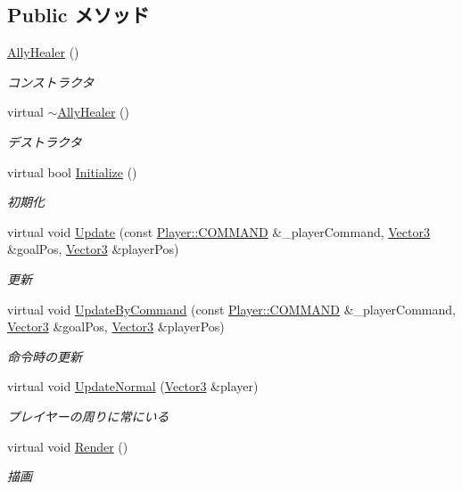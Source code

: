 \subsection*{Public メソッド}
\begin{DoxyCompactItemize}
\item 
\hyperlink{class_ally_healer_a7d6842f1f2ffd2c76b7377963f5a609c}{Ally\-Healer} ()
\begin{DoxyCompactList}\small\item\em コンストラクタ \end{DoxyCompactList}\item 
virtual \hyperlink{class_ally_healer_a7bbf70f818b82171e2224d83729d20a3}{$\sim$\-Ally\-Healer} ()
\begin{DoxyCompactList}\small\item\em デストラクタ \end{DoxyCompactList}\item 
virtual bool \hyperlink{class_ally_healer_a657b123a6d4a90e1f21ac8d88a90e4c4}{Initialize} ()
\begin{DoxyCompactList}\small\item\em 初期化 \end{DoxyCompactList}\item 
virtual void \hyperlink{class_ally_healer_a24604a4c5c8d922833721a94d2edc04c}{Update} (const \hyperlink{class_player_a70057174eaea9fd441ca86cc7bb896ed}{Player\-::\-C\-O\-M\-M\-A\-N\-D} \&\-\_\-player\-Command, \hyperlink{struct_vector3}{Vector3} \&goal\-Pos, \hyperlink{struct_vector3}{Vector3} \&player\-Pos)
\begin{DoxyCompactList}\small\item\em 更新 \end{DoxyCompactList}\item 
virtual void \hyperlink{class_ally_healer_a9ddce68a7c042137a3cc459e61a60104}{Update\-By\-Command} (const \hyperlink{class_player_a70057174eaea9fd441ca86cc7bb896ed}{Player\-::\-C\-O\-M\-M\-A\-N\-D} \&\-\_\-player\-Command, \hyperlink{struct_vector3}{Vector3} \&goal\-Pos, \hyperlink{struct_vector3}{Vector3} \&player\-Pos)
\begin{DoxyCompactList}\small\item\em 命令時の更新 \end{DoxyCompactList}\item 
virtual void \hyperlink{class_ally_healer_aca96222aed49e55506bed0811fac14da}{Update\-Normal} (\hyperlink{struct_vector3}{Vector3} \&player)
\begin{DoxyCompactList}\small\item\em プレイヤーの周りに常にいる \end{DoxyCompactList}\item 
virtual void \hyperlink{class_ally_healer_a38855aeb63c4f19b2a5cbfdb7a3836b6}{Render} ()
\begin{DoxyCompactList}\small\item\em 描画 \end{DoxyCompactList}\end{DoxyCompactItemize}
